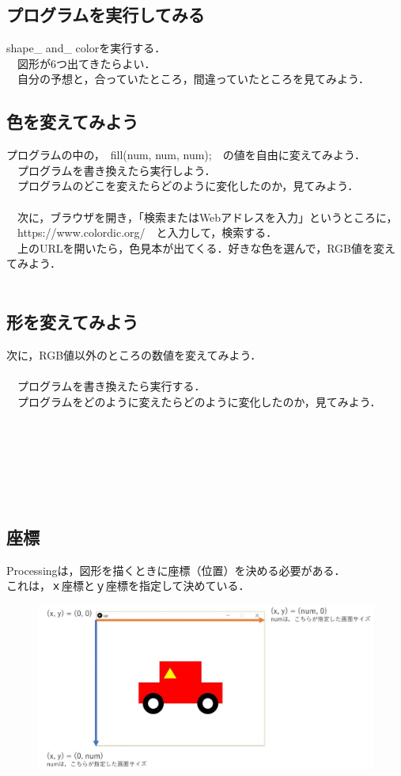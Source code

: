 \documentclass[a4j]{jarticle}
\begin{document}
\subsection{プログラムを実行してみる}
shape\_ and\_ colorを実行する．\\
　図形が6つ出てきたらよい．\\
　自分の予想と，合っていたところ，間違っていたところを見てみよう．

\subsection{色を変えてみよう}
プログラムの中の，　fill(num, num, num);　の値を自由に変えてみよう．\\
　プログラムを書き換えたら実行しよう．\\
　プログラムのどこを変えたらどのように変化したのか，見てみよう．\\
\\
　次に，ブラウザを開き，「検索またはWebアドレスを入力」というところに，\\
　https://www.colordic.org/　と入力して，検索する．\\
　上のURLを開いたら，色見本が出てくる．好きな色を選んで，RGB値を変えてみよう．\\
　

\subsection{形を変えてみよう}
次に，RGB値以外のところの数値を変えてみよう．\\
\\
　プログラムを書き換えたら実行する．\\
　プログラムをどのように変えたらどのように変化したのか，見てみよう．\\
\\
\\
\\
\\
\\
\\

\subsection{座標}
Processingは，図形を描くときに座標（位置）を決める必要がある．\\
これは，ｘ座標とｙ座標を指定して決めている．
\begin{figure}[h]
\includegraphics[width=17cm]{zahyou.JPG}
\end{figure}
\end{document}
